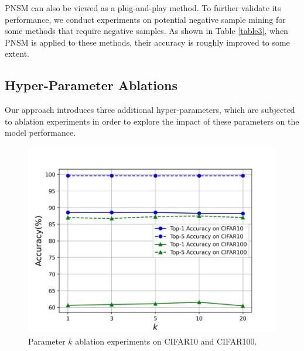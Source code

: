 \documentclass[review]{elsarticle}
\begin{document}
PNSM can also be viewed as a plug-and-play method.  To further validate its performance, we conduct experiments on potential negative sample mining for some methods that require negative samples. As shown in Table \ref{table3}, when PNSM is applied to these methods, their accuracy is roughly improved to some extent.




\subsection{Hyper-Parameter Ablations   }
Our approach introduces three additional hyper-parameters, which are subjected to ablation experiments in order to explore the impact of these parameters on the model performance.
\begin{figure}[ht]
\centering
\includegraphics[scale=0.35]{figure7.jpg}
\caption{Parameter $k$ ablation experiments on CIFAR10 and CIFAR100. }
\label{fig6}
\end{figure}
\end{document}
